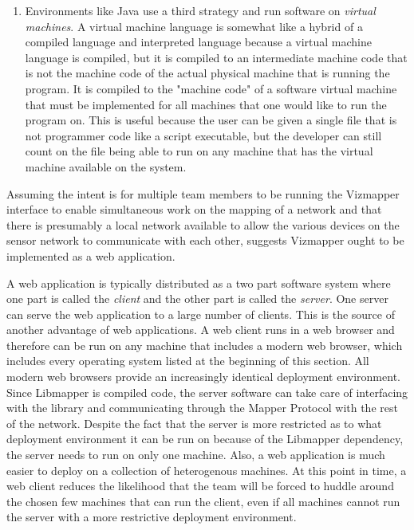 \begin{enumerate}
\item Environments like Java use a third strategy and run software on \emph{virtual machines}. A virtual machine language is somewhat like a hybrid of a compiled language and interpreted language because a virtual machine language is compiled, but it is compiled to an intermediate machine code that is not the machine code of the actual physical machine that is running the program. It is compiled to the "machine code" of a software virtual machine that must be implemented for all machines that one would like to run the program on. This is useful because the user can be given a single file that is not programmer code like a script executable, but the developer can still count on the file being able to run on any machine that has the virtual machine available on the system.
\end{enumerate}

Assuming the intent is for multiple team members to be running the Vizmapper interface to enable simultaneous work on the mapping of a network and that there is presumably a local network available to allow the various devices on the sensor network to communicate with each other, suggests Vizmapper ought to be implemented as a web application. 

A web application is typically distributed as a two part software system where one part is called the \emph{client} and the other part is called the \emph{server}. One server can serve the web application to a large number of clients. This is the source of another advantage of web applications. A web client runs in a web browser and therefore can be run on any machine that includes a modern web browser, which includes every operating system listed at the beginning of this section. All modern web browsers provide an increasingly identical deployment environment. Since Libmapper is compiled code, the server software can take care of interfacing with the library and communicating through the Mapper Protocol with the rest of the network. Despite the fact that the server is more restricted as to what deployment environment it can be run on because of the Libmapper dependency, the server needs to run on only one machine. Also, a web application is much easier to deploy on a collection of heterogenous machines. At this point in time, a web client reduces the likelihood that the team will be forced to huddle around the chosen few machines that can run the client, even if all machines cannot run the server with a more restrictive deployment environment.


